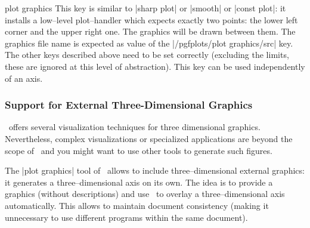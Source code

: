 {{\begin{pgfplotskey}{plot graphics}
	This key is similar to |sharp plot| or |smooth| or |const plot|: it installs a low--level plot--handler which expects exactly two points: the lower left corner and the upper right one. The graphics will be drawn between them. The graphics file name is expected as value of the |/pgfplots/plot graphics/src| key. The other keys described above need to be set correctly (excluding the limits, these are ignored at this level of abstraction). This key can be used independently of an axis.
\end{pgfplotskey}

	
\subsubsection*{Support for External Three-Dimensional Graphics}
\label{sec:plotgraphics3d}
\PGFPlots\ offers several visualization techniques for three dimensional graphics. Nevertheless, complex visualizations or specialized applications are beyond the scope of \PGFPlots\ and you might want to use other tools to generate such figures. 

The |plot graphics| tool of \PGFPlots\ allows to include three--dimensional external graphics: it generates a three--dimensional axis on its own. The idea is to provide a graphics (without descriptions) and use \PGFPlots\ to overlay a three--dimensional axis automatically. This allows to maintain document consistency (making it unnecessary to use different programs within the same document). 

}}
